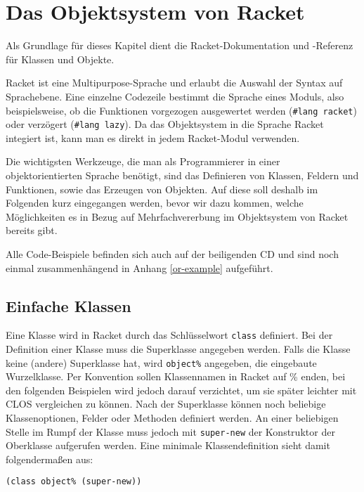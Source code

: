\section{Das Objektsystem von Racket}
Als Grundlage für dieses Kapitel dient die Racket-Dokumentation \cite{racketguide-classes} und -Referenz \cite{racketref-classes} für Klassen und Objekte.

Racket ist eine Multipurpose-Sprache und erlaubt die Auswahl der Syntax auf Sprachebene. Eine einzelne Codezeile bestimmt die Sprache eines Moduls, also beispielsweise, ob die Funktionen vorgezogen ausgewertet werden (\texttt{\#lang racket}) oder verzögert (\texttt{\#lang lazy}). Da das Objektsystem in die Sprache Racket integiert ist, kann man es direkt in jedem Racket-Modul verwenden.

Die wichtigsten Werkzeuge, die man als Programmierer in einer objektorientierten Sprache benötigt, sind das Definieren von Klassen, Feldern und Funktionen, sowie das Erzeugen von Objekten. Auf diese soll deshalb im Folgenden kurz eingegangen werden, bevor wir dazu kommen, welche Möglichkeiten es in Bezug auf Mehrfachvererbung im Objektsystem von Racket bereits gibt.

Alle Code-Beispiele befinden sich auch auf der beiligenden CD und sind noch einmal zusammenhängend in Anhang \ref{or-example} aufgeführt. 

\subsection{Einfache Klassen}

Eine Klasse wird in Racket durch das Schlüsselwort \texttt{class} definiert. Bei der Definition einer Klasse muss die Superklasse angegeben werden. Falls die Klasse keine (andere) Superklasse hat, wird \texttt{object\%} angegeben, die eingebaute Wurzelklasse. Per Konvention sollen Klassennamen in Racket auf \% enden, bei den folgenden Beispielen wird jedoch darauf verzichtet, um sie später leichter mit CLOS vergleichen zu können. Nach der Superklasse können noch beliebige Klassenoptionen, Felder oder Methoden definiert werden. An einer beliebigen Stelle im Rumpf der Klasse muss jedoch mit \texttt{super-new} der Konstruktor der Oberklasse aufgerufen werden. Eine minimale Klassendefinition sieht damit folgendermaßen aus:

\begin{lstlisting}
(class object% (super-new))
\end{lstlisting}


